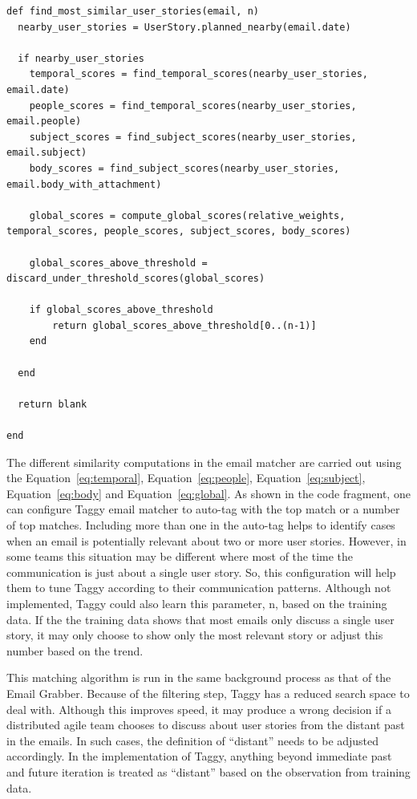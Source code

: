 \pagebreak              
\begin{verbatim}
def	find_most_similar_user_stories(email, n)
  nearby_user_stories = UserStory.planned_nearby(email.date)

  if nearby_user_stories
    temporal_scores = find_temporal_scores(nearby_user_stories, email.date)
    people_scores = find_temporal_scores(nearby_user_stories, email.people)
    subject_scores = find_subject_scores(nearby_user_stories, email.subject)
    body_scores = find_subject_scores(nearby_user_stories, email.body_with_attachment)

    global_scores = compute_global_scores(relative_weights, temporal_scores, people_scores, subject_scores, body_scores)

    global_scores_above_threshold =  discard_under_threshold_scores(global_scores)

    if global_scores_above_threshold
    	return global_scores_above_threshold[0..(n-1)]
    end
		
  end
	
  return blank
	
end
\end{verbatim}

The different similarity computations in the email matcher are carried out using the Equation~\ref{eq:temporal}, Equation~\ref{eq:people}, Equation~\ref{eq:subject}, Equation~\ref{eq:body} and Equation~\ref{eq:global}. As shown in the code fragment, one can configure Taggy email matcher to auto-tag with the top match or a number of top matches. Including more than one in the auto-tag helps to identify cases when an email is potentially relevant about two or more user stories. However, in some teams this situation may be different where most of the time the communication is just about a single user story. So, this configuration will help them to tune Taggy according to their communication patterns. Although not implemented, Taggy could also learn this parameter, n, based on the training data. If the the training data shows that most emails only discuss a single user story, it may only choose to show only the most relevant story or adjust this number based on the trend.

This matching algorithm is run in the same background process as that of the Email Grabber. Because of the filtering step, Taggy has a reduced search space to deal with. Although this improves speed, it may produce a wrong decision if a distributed agile team chooses to discuss about user stories from the distant past in the emails. In such cases, the definition of ``distant'' needs to be adjusted accordingly. In the implementation of Taggy, anything beyond immediate past and future iteration is treated as ``distant'' based on the observation from training data.

